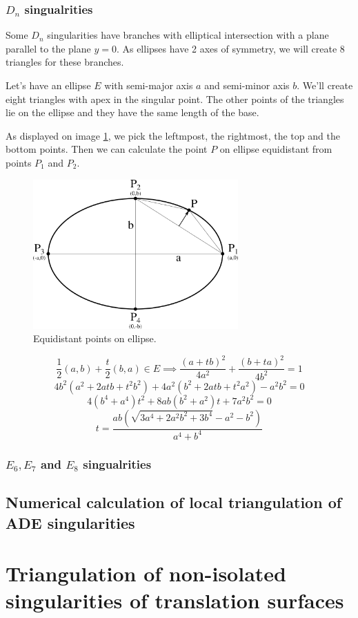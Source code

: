 \subsubsection*{$D_n$ singualrities}
Some $D_n$ singularities have branches with elliptical intersection with 
a plane parallel to the plane $y=0$. As ellipses have 2 axes of symmetry,
we will create 8 triangles for these branches.

Let's have an ellipse $E$ with semi-major axis $a$ and semi-minor axis $b$.
We'll create eight triangles with apex in the singular point. The other
points of the triangles lie on the ellipse and they have the same length
of the base.

As displayed on image \ref{img:13}, we pick the leftmpost, the rightmost, the top
and the bottom points. Then we can calculate the point $P$ on ellipse equidistant
from points $P_1$ and $P_2$.

\begin{figure}
    \centerline{\includegraphics[width=0.7\textwidth]{images/img13}}
    \caption[Equidistant points on ellipse.]
    {Equidistant points on ellipse.}
    \label{img:13}
\end{figure}

$$\frac{1}{2}(a,b) + \frac{t}{2}(b,a) \in E \implies 
\frac{(a+tb)^2}{4a^2} + \frac{(b+ta)^2}{4b^2} = 1$$
$$4b^2(a^2+2atb+t^2b^2)+4a^2(b^2+2atb+t^2a^2)-a^2b^2=0$$
$$4(b^4+a^4)t^2+8ab(b^2+a^2)t+7a^2b^2=0$$
$$t=\frac{ab(\sqrt{3a^4+2a^2b^2+3b^4}-a^2-b^2)}{a^4+b^4}$$


\subsubsection*{$E_6, E_7$ and $E_8$ singualrities}

\subsection*{Numerical calculation of local triangulation of ADE singularities}


\section{Triangulation of non-isolated singularities of translation surfaces}
\label{sub3.3}
